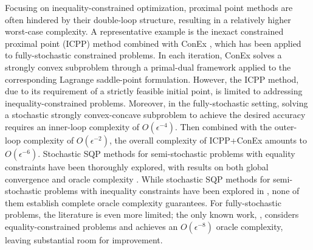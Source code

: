 \documentclass[11pt]{article}
\begin{document}
Focusing on inequality-constrained optimization, proximal point methods are often hindered by their double-loop structure, resulting in a relatively higher worst-case complexity.  
{A representative example is the inexact constrained proximal point (ICPP) method combined with ConEx \cite{boob2023stochastic}, which has been applied to fully-stochastic constrained problems.}
In each iteration, ConEx solves a strongly convex subproblem {through} a primal-dual framework {applied to} the corresponding Lagrange saddle-point formulation. 
However, the ICPP method, due to its requirement of a strictly feasible initial point, is limited to addressing inequality-constrained problems. Moreover, {in the fully-stochastic setting}, solving a stochastic strongly convex-concave subproblem to achieve the desired accuracy requires {an inner-loop} complexity of \(O(\epsilon^{-4})\). 
Then combined with the outer-loop complexity of $O(\epsilon^{-2})$, the overall complexity of ICPP+ConEx amounts to $O(\epsilon^{-6})$.
Stochastic SQP methods for semi-stochastic problems with equality constraints have been thoroughly explored, with results on both global convergence and oracle complexity \cite{berahas2021sequential,curtis2024worst,na2023adaptive}. While stochastic SQP methods for semi-stochastic problems with inequality constraints have been explored in \cite{curtis2024sequential,na2023inequality,qiu2023sequential}, 
{none of them establish complete oracle complexity guarantees.} 
{For fully-stochastic problems, the literature is even more limited; the only known work, \cite{shen2025sequential}, considers equality-constrained problems and achieves an $O(\epsilon^{-8})$ oracle complexity, leaving substantial room for improvement.}
\end{document}
